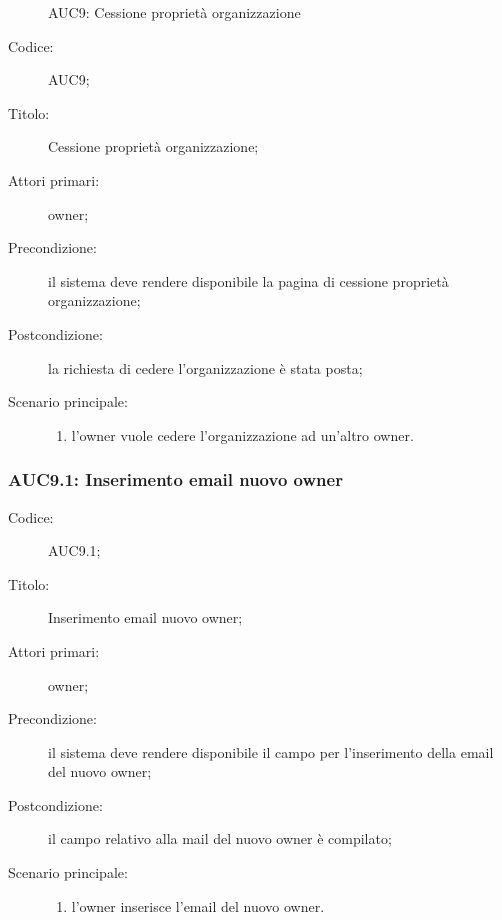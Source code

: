 \documentclass[../../../analisi-dei-requisiti.tex]{subfiles}
\begin{document}
\begin{figure}[H]
  \centering
  \caption{AUC9: Cessione proprietà organizzazione}%
  \label{fig:auc9}
\end{figure}

\begin{description}
  \item[Codice:] AUC9;
  \item[Titolo:] Cessione proprietà organizzazione;
  \item[Attori primari:] owner;
  \item[Precondizione:] il sistema deve rendere disponibile la pagina di cessione proprietà organizzazione;
  \item[Postcondizione:] la richiesta di cedere l'organizzazione è stata posta;
  \item[Scenario principale:]
  \begin{enumerate}
    \item l'owner vuole cedere l'organizzazione ad un'altro owner.
  \end{enumerate}
\end{description}

\subsubsection{AUC9.1: Inserimento email nuovo owner}%
\label{subs:AUC9.1}
\begin{description}
  \item[Codice:] AUC9.1;
  \item[Titolo:] Inserimento email nuovo owner;
  \item[Attori primari:] owner;
  \item[Precondizione:] il sistema deve rendere disponibile il campo per l'inserimento della email del nuovo owner;
  \item[Postcondizione:] il campo relativo alla mail del nuovo owner è compilato;
  \item[Scenario principale:]
  \begin{enumerate}
    \item l'owner inserisce l'email del nuovo owner.
  \end{enumerate}
\end{description}
\end{document}
